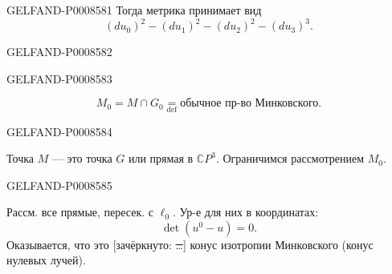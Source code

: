 \begin{GelfandAdjacentEvidence}{GELFAND-P000858}{1}
Тогда метрика принимает вид
\[
(du_0)^2-(du_1)^2-(du_2)^2-(du_3)^3.\tag{25}
\]
\end{GelfandAdjacentEvidence}
\begin{GelfandAdjacentEvidence}{GELFAND-P000858}{2}

\end{GelfandAdjacentEvidence}
\begin{GelfandAdjacentEvidence}{GELFAND-P000858}{3}

\[
M_0=M\cap G_0\underset{\mathrm{def}}{=}\text{обычное пр-во Минковского}.\tag{26}
\]
\end{GelfandAdjacentEvidence}
\begin{GelfandAdjacentEvidence}{GELFAND-P000858}{4}


Точка \(M\) — это точка \(G\) или прямая в \(\mathbb{C}P^3\).
Ограничимся рассмотрением \(M_0\).
\end{GelfandAdjacentEvidence}
\begin{GelfandAdjacentEvidence}{GELFAND-P000858}{5}


Рассм. все прямые, пересек. с \(\ell_0\).
Ур-е для них в координатах:
\[
\det(u^0-u)=0.\tag{27}
\]
Оказывается, что это [зачёркнуто: \sout{…}] конус изотропии Минковского (конус нулевых лучей).
\end{GelfandAdjacentEvidence}
